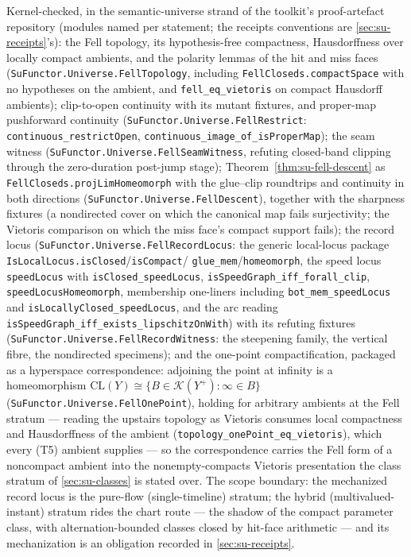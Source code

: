\begin{remark}
\label{rem:su-carrier-mechanized}
\sloppy
Kernel-checked, in the semantic-universe strand of the toolkit's
proof-artefact repository (modules named per statement; the receipts
conventions are \autoref{sec:su-receipts}'s): the Fell topology,
its hypothesis-free compactness, Hausdorffness over locally compact
ambients, and the polarity lemmas of the hit and miss faces
(\texttt{SuFunctor.Universe.FellTopology}, including
\texttt{FellCloseds.compactSpace} with no hypotheses on the ambient,
and \texttt{fell\_eq\_vietoris} on compact Hausdorff ambients);
clip-to-open continuity with its mutant fixtures, and proper-map
pushforward continuity (\texttt{SuFunctor.Universe.FellRestrict}:
\texttt{continuous\_restrictOpen},
\texttt{continuous\_image\_of\_isProperMap}); the seam witness
(\texttt{SuFunctor.Universe.FellSeamWitness}, refuting closed-band
clipping through the zero-duration post-jump stage);
Theorem~\ref{thm:su-fell-descent} as
\texttt{FellCloseds.projLimHomeomorph} with the glue--clip roundtrips
and continuity in both directions
(\texttt{SuFunctor.Universe.FellDescent}), together with the
sharpness fixtures (a nondirected cover on which the canonical map
fails surjectivity; the Vietoris comparison on which the miss face's
compact support fails); the record locus
(\texttt{SuFunctor.Universe.FellRecordLocus}: the generic local-locus
package \texttt{IsLocalLocus.isClosed}/\texttt{isCompact}/%
\texttt{glue\_mem}/\texttt{homeomorph}, the speed locus
\texttt{speedLocus} with \texttt{isClosed\_speedLocus},
\texttt{isSpeedGraph\_iff\_forall\_clip},
\texttt{speedLocusHomeomorph}, membership one-liners including
\texttt{bot\_mem\_speedLocus} and
\texttt{isLocallyClosed\_speedLocus}, and the arc reading
\texttt{isSpeedGraph\_iff\_exists\_lipschitzOnWith}) with its
refuting fixtures (\texttt{SuFunctor.Universe.FellRecordWitness}:
the steepening family, the vertical fibre, the nondirected
specimens); and the one-point compactification, packaged as a
hyperspace correspondence: adjoining the point at infinity is a
homeomorphism
$\mathrm{CL}(Y) \cong \{B \in \mathcal{K}(Y^{+}) : \infty \in B\}$
(\texttt{SuFunctor.Universe.FellOnePoint}),
holding for arbitrary ambients at the Fell stratum --- reading the
upstairs topology as Vietoris consumes local compactness and
Hausdorffness of the ambient
(\texttt{topology\_onePoint\_eq\_vietoris}), which every (T5)
ambient supplies --- so the correspondence carries the Fell form of
a noncompact ambient into the
nonempty-compacts Vietoris presentation the class stratum of
\autoref{sec:su-classes} is stated over. The scope boundary: the mechanized record locus is the
pure-flow (single-timeline) stratum; the hybrid
(multivalued-instant) stratum rides the chart route --- the shadow
of the compact parameter class, with alternation-bounded classes
closed by hit-face arithmetic --- and its mechanization is an
obligation recorded in \autoref{sec:su-receipts}.
\end{remark}

